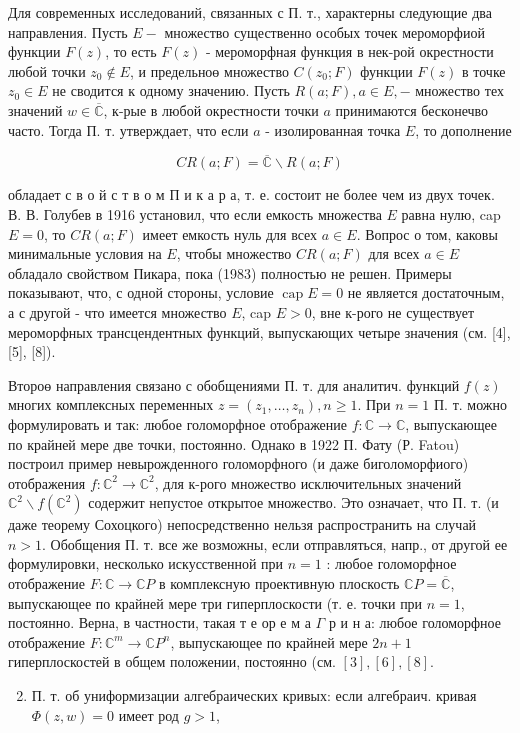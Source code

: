 \documentclass[10pt]{article}
\begin{document}
Для современных исследований, связанных с П. т., характерны следующие два направления. Пусть $E-$ множество существенно особых точек мероморфиой функции $F(z)$, то есть $F(z)$ - мероморфная функция в нек-рой окрестности любой точки $z_{0} \notin E$, и предельноө множество $C\left(z_{0} ; F\right)$ функции $F(z)$ в точке $z_{0} \in E$ не сводится к одному значению. Пусть $R(a ; F), a \in E,-$ множество тех значений $w \in \overline{\mathbb{C}}$, к-рые в любой окрестности точки $a$ принимаются бесконечво часто. Тогда П. т. утверждает, что если $a$ - изолированная точка $E$, то дополнение

\[
C R(a ; F)=\overline{\mathbb{C}} \backslash R(a ; F)
\]

обладает с в о й с т в о м П и к а р а, т. е. состоит не более чем из двух точек. В. В. Голубев в 1916 установил, что если емкость множества $E$ равна нулю, cap $E=0$, то $C R(a ; F)$ имеет емкость нуль для всех $a \in E$. Вопрос о том, каковы минимальные условия на $E$, чтобы множество $C R(a ; F)$ для всех $a \in E$ обладало свойством Пикара, пока (1983) полностью не решен. Примеры показывают, что, с одной стороны, условие $\operatorname{cap} E=0$ не является достаточным, а с другой - что имеется множество $E$, cap $E>0$, вне к-рого не существует мероморфных трансцендентных функций, выпускающих четыре значения (см. [4], [5], [8]).

Второө направления связано с обобщениями П. т. для аналитич. функций $f(z)$ многих комплексных переменных $z=\left(z_{1}, \ldots, z_{n}\right), n \geqslant 1$. При $n=1$ П. т. можно формулировать и так: любое голоморфное отображение $f: \mathbb{C} \rightarrow \mathbb{C}$, выпускающее по крайней мере две точки, постоянно. Однако в 1922 П. Фату (Р. Fatou) построил пример невырожденного голоморфного (и даже биголоморфиого) отображения $f: \mathbb{C}^{2} \rightarrow \mathbb{C}^{2}$, для к-рого множество исключительных значений $\mathbb{C}^{2} \backslash f\left(\mathbb{C}^{2}\right)$ содержит непустое открытое множество. Это означает, что П. т. (и даже теорему Сохоцкого) непосредственно нельзя распространить на случай $n>1$. Обобщения П. т. все же возможны, если отправляться, напр., от другой ее формулировки, несколько искусственной при $n=1$ : любое голоморфное отображение $F: \mathbb{C} \rightarrow \mathbb{C} P$ в комплексную проективную плоскость $\mathbb{C} P=\overline{\mathbb{C}}$, выпускающее по крайней мере три гиперплоскости (т. е. точки при $n=1$, постоянно. Верна, в частности, такая т е ор е м а $\Gamma$ р и н а: любое голоморфное отображение $F: \mathbb{C}^{m} \rightarrow \mathbb{C} P^{n}$, выпускающее по крайней мере $2 n+1$ гиперплоскостей в общем положении, постоянно (см. $[3],[6],[8]$.

\begin{enumerate}
  \setcounter{enumi}{1}
  \item П. т. об униформизации алгебраических кривых: если алгебраич. кривая $\Phi(z, w)=0$ имеет род $g>1$,
\end{enumerate}
\end{document}
